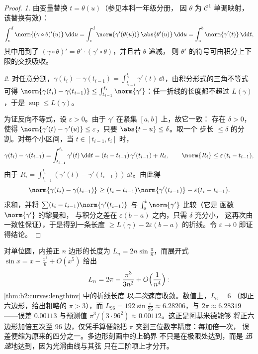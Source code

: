 \begin{proof}
\emph{1.} 由变量替换 $t = \theta(u)$（参见本科一年级分册，
因 $\theta$ 为 $\mathcal{C}^1$ 单调映射，该替换有效）：
\[
\int_c^d \norm{(\gamma\circ\theta)'(u)}\,\dd u
= \int_c^d \norm{\gamma'(\theta(u))}\,\abs{\theta'(u)}\,\dd u
= \int_a^b \norm{\gamma'(t)}\,\dd t ,
\]
其中用到了 $(\gamma\circ\theta)' = \theta'\cdot
(\gamma'\circ\theta)$，并且若 $\theta$ 递减，
则 $\theta'$ 的符号可由积分上下限的交换吸收。

\emph{2.} 对任意分割，$\gamma(t_i) - \gamma(t_{i-1}) =
\int_{t_{i-1}}^{t_i}\gamma'(t)\,\dd t$，由积分形式的三角不等式
可得 $\norm{\gamma(t_i) - \gamma(t_{i-1})}
\leq \int_{t_{i-1}}^{t_i}\norm{\gamma'}$：任一折线的长度都不超过
$L(\gamma)$，于是 $\sup \leq L(\gamma)$。

为证反向不等式，设 $\varepsilon > 0$。由于 $\gamma'$
在紧集 $[a,b]$ 上，故它一致：
存在 $\delta > 0$，使得 $\norm{\gamma'(t) - \gamma'(u)} \leq
\varepsilon$，只要 $\abs{t - u} \leq \delta$。取一个
步长 $\leq \delta$ 的分割。对每个小区间，当 $t \in [t_{i-1}, t_i]$ 时，
\[
\gamma(t_i) - \gamma(t_{i-1})
= \int_{t_{i-1}}^{t_i}\gamma'(t)\,\dd t
= (t_i - t_{i-1})\,\gamma'(t_{i-1}) + R_i,
\qquad
\norm{R_i} \leq \varepsilon\,(t_i - t_{i-1}),
\]
由于 $R_i = \int_{t_{i-1}}^{t_i}(\gamma'(t) -
\gamma'(t_{i-1}))\,\dd t$。由此得
\[
\norm{\gamma(t_i) - \gamma(t_{i-1})}
\geq (t_i - t_{i-1})\norm{\gamma'(t_{i-1})}
- \varepsilon (t_i - t_{i-1}) .
\]
求和，并将 $\sum (t_i -
t_{i-1})\norm{\gamma'(t_{i-1})}$ 与 $\int_a^b\norm{\gamma'}$ 比较（它是
函数 $\norm{\gamma'}$ 的黎曼和，
与积分之差在 $\varepsilon(b - a)$ 之内，只需 $\delta$ 充分小，
这再次由一致性保证），于是得到一条长度 $\geq
L(\gamma) - 2\varepsilon(b - a)$ 的折线。令 $\varepsilon \to 0$
即证得结论。
\end{proof}

\begin{example}\label{ex:b2:curves:archimedes}
对单位圆，内接正 $n$ 边形的长度为
$L_n = 2n\sin\frac\pi n$，而展开式 $\sin x = x -
\frac{x^3}6 + O(x^5)$ 给出
\[
L_n = 2\pi - \frac{\pi^3}{3n^2} + O\Bigl(\frac1{n^4}\Bigr) :
\]
\cref{thm:b2:curves:lengthinv} 中的折线长度
以\emph{二次}速度收敛。数值上，$L_6 = 6$
（即正六边形，给出粗略的 $\pi > 3$），而 $L_{96} =
192\sin\frac{\pi}{96} \approx 6.28206$，与 $2\pi \approx
6.28319$——误差 $0.00113$ 与预测值
$\pi^3/(3\cdot96^2) \approx 0.00112$。这正是阿基米德能够
将正六边形加倍五次至 $96$ 边，仅凭手算便能把
$\pi$ 夹到三位数字精度：每加倍一次，
误差便缩为原来的四分之一。多边形刻画中的上确界
不只是在极限处达到，而是
\emph{迅速}地达到，因为光滑曲线与其弦
只在二阶项上才分开。
\end{example}

